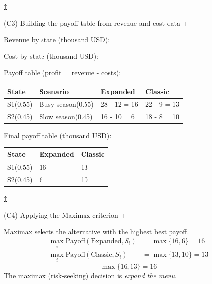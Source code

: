 \documentclass[11pt]{article}
\begin{document}
	
	
	
	
	\hyperref[problem1-criteria]{↑}
	
	
	
	
	(C3) Building the payoff table from revenue and cost data
	+
	
	
	Revenue by state (thousand USD):
	
	Cost by state (thousand USD):
	
	Payoff table (profit = revenue - costs):
	\begin{center}
		\begin{tabular}{llll}
			\toprule
			State & Scenario & Expanded & Classic \\
			\midrule
			S1\newline (0.55) & Busy season\newline (0.55) & 28 - 12 = 16 & 22 - 9 = 13 \\
			S2\newline (0.45) & Slow season\newline (0.45) & 16 - 10 = 6 & 18 - 8 = 10 \\
			\bottomrule
		\end{tabular}
	\end{center}
	
	
	Final payoff table (thousand USD):
	\begin{center}
		\begin{tabular}{lll}
			\toprule
			State & Expanded & Classic \\
			\midrule
			S1\newline (0.55) & 16 & 13 \\
			S2\newline (0.45) & 6 & 10 \\
			\bottomrule
		\end{tabular}
	\end{center}
	
	
	
	
	\hyperref[problem1-criteria]{↑}
	
	
	
	
	(C4) Applying the Maximax criterion
	+
	
	
	Maximax selects the alternative with the highest best payoff.
	\[
	\begin{aligned}
		\max_i \text{Payoff}(\text{Expanded}, S_i) &= \max\{16, 6\} = 16 \\
		\max_i \text{Payoff}(\text{Classic}, S_i) &= \max\{13, 10\} = 13
	\end{aligned}
	\]
	\[
	\max\{16, 13\} = 16
	\]
	The maximax (risk-seeking) decision is \emph{expand the menu}.
	
\end{document}
